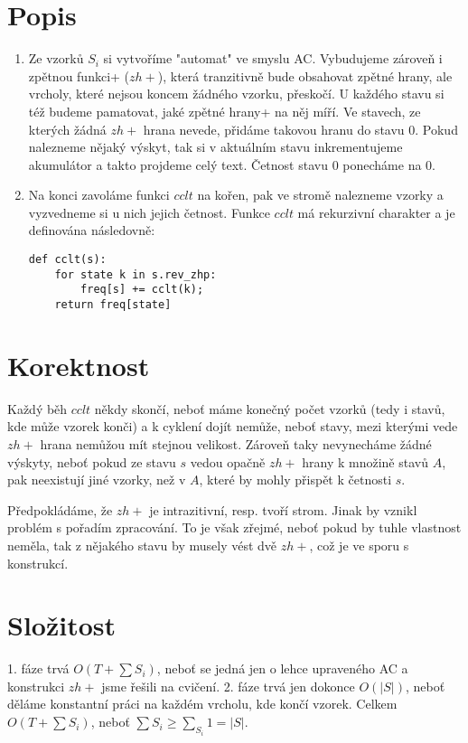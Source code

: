 \documentclass[a4paper]{article}
\begin{document}
\renewcommand{\headrulewidth}{0pt} %
\thispagestyle{fancy} %
{}

\section*{Popis}
\begin{enumerate}
\item 
Ze vzorků $S_i$ si vytvoříme "automat" ve smyslu AC. Vybudujeme zároveň i zpětnou funkci+ ($zh+$), která tranzitivně bude obsahovat zpětné hrany, ale vrcholy, které nejsou koncem žádného vzorku, přeskočí. U každého stavu si též budeme pamatovat, jaké zpětné hrany+ na něj míří. Ve stavech, ze kterých žádná $zh+$ hrana nevede, přidáme takovou hranu do stavu $0$. Pokud nalezneme nějaký výskyt, tak si v aktuálním stavu inkrementujeme akumulátor a takto projdeme celý text. Četnost stavu $0$ ponecháme na $0$.
\item
Na konci zavoláme funkci $cclt$ na kořen, pak ve stromě nalezneme vzorky a vyzvedneme si u nich jejich četnost. Funkce $cclt$ má rekurzivní charakter a je definována následovně:
\begin{lstlisting}
def cclt(s):
	for state k in s.rev_zhp:
		freq[s] += cclt(k);
	return freq[state]
\end{lstlisting}
\end{enumerate}

\section*{Korektnost}
Každý běh $cclt$ někdy skončí, neboť máme konečný počet vzorků (tedy i stavů, kde může vzorek konči) a k cyklení dojít nemůže, neboť stavy, mezi kterými vede $zh+$ hrana nemůžou mít stejnou velikost. Zároveň taky nevynecháme žádné výskyty, neboť pokud ze stavu $s$ vedou opačně $zh+$ hrany k množině stavů $A$, pak neexistují jiné vzorky, než v $A$, které by mohly přispět k četnosti $s$.

Předpokládáme, že $zh+$ je intrazitivní, resp. tvoří strom. Jinak by vznikl problém s pořadím zpracování. To je však zřejmé, neboť pokud by tuhle vlastnost neměla, tak z nějakého stavu by musely vést dvě $zh+$, což je ve sporu s konstrukcí.

\section*{Složitost}
1. fáze trvá $O(T+\sum S_i)$, neboť se jedná jen o lehce upraveného AC a konstrukci $zh+$ jsme řešili na cvičení. 2. fáze trvá jen dokonce $O(|S|)$, neboť děláme konstantní práci na každém vrcholu, kde končí vzorek. Celkem $O(T+\sum S_i)$, neboť $\sum S_i \ge \sum_{S_i} 1 = |S|$.
\end{document}
